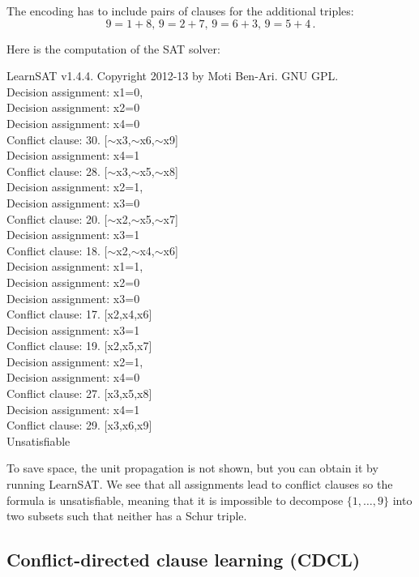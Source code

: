 \documentclass[11pt,a4paper]{article}
\begin{document}
The encoding has to include pairs of clauses for the additional triples:
\[
9=1+8,\, 9=2+7,\, 9=6+3,\, 9=5+4\,.
\]

Here is the computation of the SAT solver:

\begin{ttfamily}
LearnSAT v1.4.4. Copyright 2012-13 by Moti Ben-Ari. GNU GPL.\\
Decision assignment: x1=0,\\
Decision assignment: x2=0\\
Decision assignment: x4=0\\
Conflict clause: 30. [$\sim$x3,$\sim$x6,$\sim$x9]\\
Decision assignment: x4=1\\
Conflict clause: 28. [$\sim$x3,$\sim$x5,$\sim$x8]\\
Decision assignment: x2=1,\\
Decision assignment: x3=0\\
Conflict clause: 20. [$\sim$x2,$\sim$x5,$\sim$x7]\\
Decision assignment: x3=1\\
Conflict clause: 18. [$\sim$x2,$\sim$x4,$\sim$x6]\\
Decision assignment: x1=1,\\
Decision assignment: x2=0\\
Decision assignment: x3=0\\
Conflict clause: 17. [x2,x4,x6]\\
Decision assignment: x3=1\\
Conflict clause: 19. [x2,x5,x7]\\
Decision assignment: x2=1,\\
Decision assignment: x4=0\\
Conflict clause: 27. [x3,x5,x8]\\
Decision assignment: x4=1\\
Conflict clause: 29. [x3,x6,x9]\\
Unsatisfiable\\
\end{ttfamily}

To save space, the unit propagation is not shown, but you can obtain it by running LearnSAT. We see that all assignments lead to conflict clauses so the formula is unsatisfiable, meaning that it is impossible to decompose $\{1,\ldots,9\}$ into two subsets such that neither has a Schur triple.

\subsection*{Conflict-directed clause learning (CDCL)}
\end{document}
